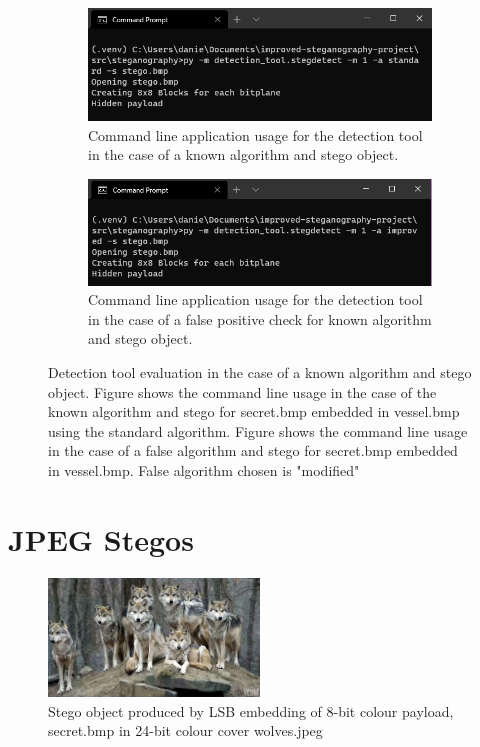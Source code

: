 \documentclass{l4proj}
\begin{document}
\begin{appendices}
\begin{figure}[!h]
    \centering
    \begin{subfigure}[b]{0.75\textwidth}
        \includegraphics[width=\textwidth]{images/evaluation_detection_tool_knownalgo}
        \caption{Command line application usage for the detection tool in the case of a known algorithm and stego object.}
        \label{fig:known_algo_and_stego}
    \end{subfigure}
    \begin{subfigure}[b]{0.75\textwidth}
        \includegraphics[width=\textwidth]{images/knownalgo_false_check.png}
        \caption{Command line application usage for the detection tool in the case of a false positive check for known algorithm and stego object.}
        \label{fig:known_algo_and_stego_falsecheck}
    \end{subfigure}
    \caption{Detection tool evaluation in the case of a known algorithm and stego object. Figure  shows the command line usage in the case of the known algorithm and stego for secret.bmp embedded in vessel.bmp using the standard algorithm. Figure  shows the command line usage in the case of a false algorithm and stego  for secret.bmp embedded in vessel.bmp. False algorithm chosen is "modified"}
\end{figure}

\chapter{JPEG Stegos}

\begin{figure}[!h]
    \centering
    \includegraphics[width=0.5\textwidth]{images/wolves.jpg}
    \caption{Stego object produced by LSB embedding of 8-bit colour payload, secret.bmp in 24-bit colour cover wolves.jpeg}
    \label{fig:wolf}
\end{figure}


\end{appendices}
\end{document}
